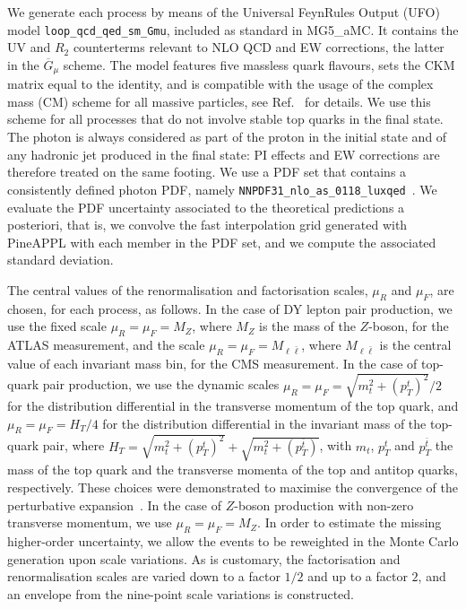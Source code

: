 We generate each process by means of the Universal FeynRules Output
(UFO)~\cite{Degrande:2011ua} model {\tt loop\_qcd\_qed\_sm\_Gmu},
included as standard in {\sc MG5\_aMC}. It contains the UV and $R_2$
counterterms relevant to NLO QCD and EW corrections, the latter in the
$\overline{G}_\mu$ scheme. The model features five massless quark flavours,
sets the CKM matrix equal to the identity, and is compatible with the usage of
the complex mass (CM) scheme for all massive particles, see
Ref.~\cite{Frederix:2018nkq} for details. We use this scheme
for all processes that do not involve stable top quarks in the final state.
The photon is always considered as part of the proton in the initial state and
of any hadronic jet produced in the final state: PI effects and EW corrections
are therefore treated on the same footing. We use a PDF set that contains a
consistently defined photon PDF, namely
{\tt NNPDF31\_nlo\_as\_0118\_luxqed}~\cite{Bertone:2017bme}. We evaluate the PDF
uncertainty associated to the theoretical predictions a posteriori, that is,
we convolve the fast interpolation grid generated with {\sc PineAPPL} with
each member in the PDF set, and we compute the associated standard deviation.

The central values of the renormalisation and factorisation scales, $\mu_R$ and
$\mu_F$, are chosen, for each process, as follows. In the case of DY lepton pair
production, we use the fixed scale $\mu_R=\mu_F=M_Z$, where $M_Z$ is the mass
of the $Z$-boson, for the ATLAS measurement, and the scale
$\mu_R=\mu_F=M_{\ell\bar\ell}$, where $M_{\ell\bar\ell}$ is the central value of each
invariant mass bin, for the CMS measurement.
In the case of top-quark pair production, we use the dynamic scales
$\mu_R=\mu_F=\sqrt{m_t^2+(p_T^t)^2}{\Big /}2$ for the distribution differential
in the transverse momentum of the top quark, and $\mu_R=\mu_F=H_T/4$ for the
distribution differential in the invariant mass of the top-quark pair, where
$H_T=\sqrt{m_t^2+(p_T^t)^2}+\sqrt{m_t^2+(p_T^{\bar{t}})}$, with $m_t$,
$p_T^t$ and $p_T^{\bar t}$ the mass of the top quark and the transverse momenta
of the top and antitop quarks, respectively. These choices were demonstrated
to maximise the convergence of the perturbative expansion~\cite{Czakon:2016dgf}.
In the case of $Z$-boson production with non-zero transverse momentum, we use
$\mu_R=\mu_F=M_Z$. In order to estimate the missing higher-order uncertainty,
we allow the events to be reweighted in the Monte Carlo generation upon scale
variations. As is customary, the factorisation and renormalisation scales
are varied down to a factor $1/2$ and up to a factor $2$, and an envelope
from the nine-point scale variations is constructed.

